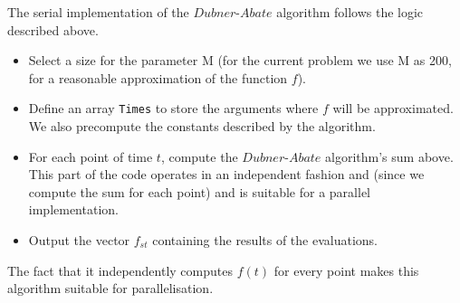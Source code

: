 The serial implementation of the $Dubner$-$Abate$ algorithm follows the logic described above.
\begin{itemize}
\item{Select a size for the parameter M (for the current problem we use M as 200, for a reasonable approximation of the function $f$).}
\item{Define an array \texttt{Times} to store the arguments where $f$ will be approximated. We also precompute the constants described by the algorithm.}
\item{For each point of time $t$, compute the $Dubner$-$Abate$ algorithm's sum above.
This part of the code operates in an independent fashion and (since we compute the sum for each point) and is suitable for a parallel implementation.}
\item{Output the vector $f_{st}$ containing the results of the evaluations.}
\end{itemize}
The fact that it independently computes $f(t)$  for every point makes this algorithm suitable for parallelisation.

